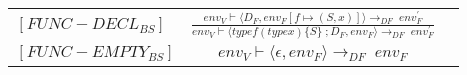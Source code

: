 \begin{semantik}
    \bgroup
    \def\arraystretch{3}
    \begin{table}[H]
    \centering
    \begin{tabular}{l c l}
        
        $[FUNC-DECL_{BS}]$ & $
        \frac{env_V \vdash \langle D_F, env_F[f \mapsto (S, x)] \rangle \rightarrow_{DF}\; env_F^\prime}
        {env_V \vdash \langle type f(type x) \{ S \}\; ; D_F, env_F \rangle \rightarrow_{DF}\; env_F^\prime}
        $ & \\
        
        $[FUNC-EMPTY_{BS}]$ & $
        env_V \vdash \langle \epsilon, env_F \rangle \rightarrow_{DF}\; env_F
        $
        
    \end{tabular}
    \label{tab:funktioner}
    \end{table}
    \egroup
    \caption{Deklaration af funktioner}
\end{semantik}


\subsubsection*{}

\subsubsection*{}

\subsubsection*{}